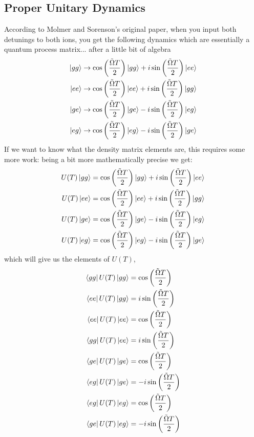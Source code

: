 \subsection{Proper Unitary Dynamics}
According to Molmer and Sorenson's original paper, when you input both detunings to both ions, you get the following dynamics which are essentially a quantum process matrix... after a little bit of algebra
\begin{align*}
	\ket{gg} &\rightarrow \cos \left(\frac{\tilde{\Omega} T}{2} \right) \ket{gg} + i  \sin \left(\frac{\tilde{\Omega} T}{2} \right)\ket{ee}\\
	\ket{ee} &\rightarrow \cos \left(\frac{\tilde{\Omega} T}{2} \right) \ket{ee} + i  \sin \left(\frac{\tilde{\Omega} T}{2} \right) \ket{gg}\\
	\ket{ge} &\rightarrow \cos \left(\frac{\tilde{\Omega} T}{2} \right) \ket{ge} - i  \sin \left(\frac{\tilde{\Omega} T}{2} \right) \ket{eg}\\
	\ket{eg} &\rightarrow \cos \left(\frac{\tilde{\Omega} T}{2} \right) \ket{eg} - i  \sin \left(\frac{\tilde{\Omega} T}{2} \right) \ket{ge}
\end{align*}
If we want to know what the density matrix elements are, this requires some more work:
being a bit more mathematically precise we get:
\begin{align*}
	U(T)\ket{gg} &= \cos \left(\frac{\tilde{\Omega} T}{2} \right) \ket{gg} + i  \sin \left(\frac{\tilde{\Omega} T}{2} \right)\ket{ee}\\
	U(T)\ket{ee} &= \cos \left(\frac{\tilde{\Omega} T}{2} \right) \ket{ee} + i  \sin \left(\frac{\tilde{\Omega} T}{2} \right) \ket{gg}\\
	U(T)\ket{ge} &= \cos \left(\frac{\tilde{\Omega} T}{2} \right) \ket{ge} - i  \sin \left(\frac{\tilde{\Omega} T}{2} \right) \ket{eg}\\
	U(T)\ket{eg} &= \cos \left(\frac{\tilde{\Omega} T}{2} \right) \ket{eg} - i  \sin \left(\frac{\tilde{\Omega} T}{2} \right) \ket{ge}
\end{align*}
which will give us the elements of $U(T)$,
\begin{align*}
	\bra{gg}U(T)\ket{gg} &= \cos \left(\frac{\tilde{\Omega} T}{2} \right) \\
	\bra{ee}U(T)\ket{gg} &=  i  \sin \left(\frac{\tilde{\Omega} T}{2} \right)\\
	\bra{ee}U(T)\ket{ee} &= \cos \left(\frac{\tilde{\Omega} T}{2} \right) \\
	\bra{gg}U(T)\ket{ee} &=  i  \sin \left(\frac{\tilde{\Omega} T}{2} \right) \\
	\bra{ge}U(T)\ket{ge} &= \cos \left(\frac{\tilde{\Omega} T}{2} \right) \\
	\bra{eg}U(T)\ket{ge} &= - i  \sin \left(\frac{\tilde{\Omega} T}{2} \right)\\
	\bra{eg}U(T)\ket{eg} &= \cos \left(\frac{\tilde{\Omega} T}{2} \right) \\
	\bra{ge}U(T)\ket{eg} &=  - i  \sin \left(\frac{\tilde{\Omega} T}{2} \right)
\end{align*}
